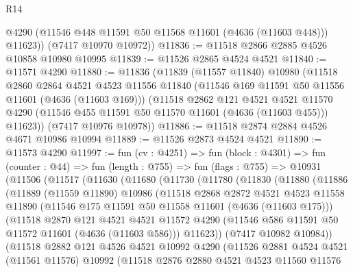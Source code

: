 \begin{lexlean}{R14}
\begin{coremodule}
          @4290
          (@11546 @448 @11591 @50 @11568 @11601 (@4636 (@11603 @448)))
          @11623))
      (@7417 @10970 @10972))
@11836 := @11518 @2866 @2885 @4526 @10858 @10980 @10995
@11839 := @11526 @2865 @4524 @4521
@11840 := @11571 @4290
@11880 := @11836
    (@11839
      (@11557 @11840)
      @10980
      (@11518
        @2860
        @2864
        @4521
        @4523
        @11556
        @11840
        (@11546 @169 @11591 @50 @11556 @11601 (@4636 (@11603 @169)))
        (@11518
          @2862
          @121
          @4521
          @4521
          @11570
          @4290
          (@11546 @455 @11591 @50 @11570 @11601 (@4636 (@11603 @455)))
          @11623))
      (@7417 @10976 @10978))
@11886 := @11518 @2874 @2884 @4526 @4671 @10986 @10994
@11889 := @11526 @2873 @4524 @4521
@11890 := @11573 @4290
@11997 := fun (cv : @4251) =>
  fun (block : @4301) =>
  fun (counter : @44) =>
  fun (length : @755) =>
  fun (flags : @755) =>
  @10931
    (@11506
      (@11517
        (@11630
          (@11680
            (@11730
              (@11780
                (@11830
                  (@11880
                    (@11886
                      (@11889
                        (@11559 @11890)
                        @10986
                        (@11518
                          @2868
                          @2872
                          @4521
                          @4523
                          @11558
                          @11890
                          (@11546 @175 @11591 @50 @11558 @11601 (@4636 (@11603 @175)))
                          (@11518
                            @2870
                            @121
                            @4521
                            @4521
                            @11572
                            @4290
                            (@11546 @586 @11591 @50 @11572 @11601 (@4636 (@11603 @586)))
                            @11623))
                        (@7417 @10982 @10984))
                      (@11518
                        @2882
                        @121
                        @4526
                        @4521
                        @10992
                        @4290
                        (@11526
                          @2881
                          @4524
                          @4521
                          (@11561 @11576)
                          @10992
                          (@11518
                            @2876
                            @2880
                            @4521
                            @4523
                            @11560
                            @11576

\end{coremodule}
\end{lexlean}
